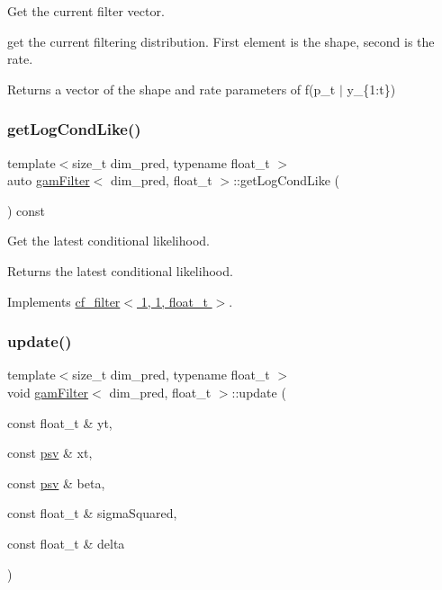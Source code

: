 Get the current filter vector. 

get the current filtering distribution. First element is the shape, second is the rate. \begin{DoxyReturn}{Returns}
a vector of the shape and rate parameters of f(p\+\_\+t $\vert$ y\+\_\+\{1\+:t\}) 
\end{DoxyReturn}
\mbox{\label{classgamFilter_a8849fcc87e594367865c14767b8849e8}} 
\subsubsection{\texorpdfstring{get\+Log\+Cond\+Like()}{getLogCondLike()}}
{\footnotesize\ttfamily template$<$size\+\_\+t dim\+\_\+pred, typename float\+\_\+t $>$ \\
auto \hyperlink{classgamFilter}{gam\+Filter}$<$ dim\+\_\+pred, float\+\_\+t $>$\+::get\+Log\+Cond\+Like (\begin{DoxyParamCaption}{ }\end{DoxyParamCaption}) const\hspace{0.3cm}{\ttfamily [virtual]}}



Get the latest conditional likelihood. 

\begin{DoxyReturn}{Returns}
the latest conditional likelihood. 
\end{DoxyReturn}


Implements \hyperlink{classcf__filter_a11b26307172bf94b8075ed2cdb8fc09c}{cf\+\_\+filter$<$ 1, 1, float\+\_\+t $>$}.

\mbox{\label{classgamFilter_af6a33d3fb634803c3b54521defb15b28}} 
\subsubsection{\texorpdfstring{update()}{update()}}
{\footnotesize\ttfamily template$<$size\+\_\+t dim\+\_\+pred, typename float\+\_\+t $>$ \\
void \hyperlink{classgamFilter}{gam\+Filter}$<$ dim\+\_\+pred, float\+\_\+t $>$\+::update (\begin{DoxyParamCaption}\item[{const float\+\_\+t \&}]{yt,  }\item[{const \hyperlink{classgamFilter_ae43550158ad06de3a1829d5cb491b3fc}{psv} \&}]{xt,  }\item[{const \hyperlink{classgamFilter_ae43550158ad06de3a1829d5cb491b3fc}{psv} \&}]{beta,  }\item[{const float\+\_\+t \&}]{sigma\+Squared,  }\item[{const float\+\_\+t \&}]{delta }\end{DoxyParamCaption})}



